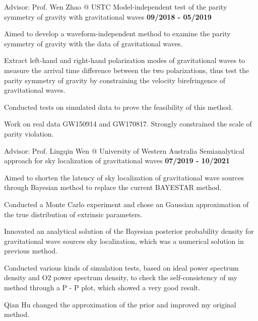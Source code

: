 
\begin{cventries}
\vspace{-0.1cm}
  \cventry
    {\textnormal{Advisor: Prof. Wen Zhao @ USTC}} %
    {Model-independent test of the parity symmetry of gravity with gravitational waves} %
    {\textcolor{awesome-emerald}{\textbf{09/2018 - 05/2019}}} %
    {} %
    {
      \begin{cvitems} %
        \item{\textnormal{Aimed to develop a waveform-independent method to examine the parity symmetry of gravity with the data of gravitational waves.}}
        \item{\textnormal{Extract left-hand and right-hand polarization modes of gravitational waves to measure the arrival time difference between the two polarizations, thus test the parity symmetry of gravity by constraining the velocity birefringence of gravitational waves.}}
        \item{\textnormal{Conducted tests on simulated data to prove the feasibility of this method.}}
        \item{\textnormal{Work on real data GW150914 and GW170817. Strongly constrained the scale of parity violation.}}
      \end{cvitems}
    }
  \vspace{0.4cm}
  \cventry
    {\textnormal{Advisor: Prof. Lingqin Wen @ University of Western Australia}} %
    {Semianalytical approach for sky localization of gravitational waves} %
    {\textcolor{awesome-emerald}{\textbf{07/2019 - 10/2021}}} %
    {} %
    {
      \begin{cvitems} %
        \item{\textnormal{Aimed to shorten the latency of sky localization of gravitational wave sources through Bayesian method to replace the current BAYESTAR method.}}
        \item{\textnormal{Conducted a Monte Carlo experiment and chose an Gaussian approximation of the true distribution of extrinsic parameters.}}
        \item {\textnormal{Innovated an analytical solution of the Bayesian posterior probability density for gravitational wave sources sky localization, which was a numerical solution in previous method.}}
        \item{\textnormal{Conducted various kinds of simulation tests, based on ideal power spectrum density and O2 power spectrum density, to check the self-consistency of my method through a P - P plot, which showed a very good result.}}
        \item {\textnormal{Qian Hu changed the approximation of the prior and improved my original method.}}
      \end{cvitems}
    }
  \vspace{-0.4cm}
\end{cventries}
